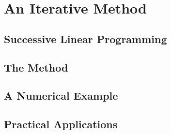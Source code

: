 \section{An Iterative Method}
\label{ch:slp}


\subsection{Successive Linear Programming}


\subsection{The Method}
\label{sec:problem}


\subsection{A Numerical Example}
\label{sec:example}


\subsection{Practical Applications}

